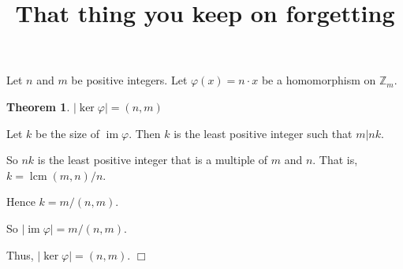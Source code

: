 \documentclass[10pt]{article}
\title{That thing you keep on forgetting}
\author{}
\date{}
\newtheorem{theorem}{Theorem}
\newenvironment{proof}[1][Proof]{\begin{trivlist}
\item[\hskip \labelsep {\bfseries #1}]}{\end{trivlist}}
\newcommand{\im}{\operatorname{im}}
\begin{document}
\maketitle{}
    Let $n$ and $m$ be positive integers. Let
    $\varphi(x) = n\cdot x$ be a homomorphism
    on $\mathbb{Z}_m$. 
    \begin{theorem}
        $|\ker\varphi| = (n,m)$
    \end{theorem}
    \begin{proof}
        Let $k$ be the size of $\im\varphi$. Then 
        $k$ is the least positive integer such that $m|nk$. 
        
        So $nk$ is the least positive integer 
        that is a multiple of $m$ and $n$. That is, $k = \operatorname{lcm}(m,n)/n$.
        
        Hence $k = m/(n,m)$.
        
        
        
        
        
        
        
                
        So $|\im\varphi| = m/(n,m)$.
        
        Thus, $|\ker\varphi| = (n,m)$. $\Box$
    \end{proof}
    
\end{document}
